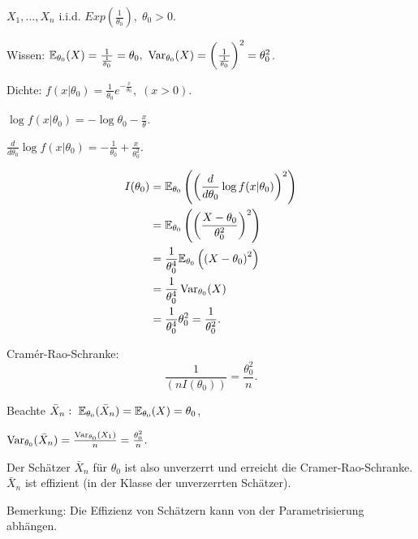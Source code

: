 \documentclass{tstextbook}
\begin{document}
\begin{example}
	$ X_1,\ldots,X_n $ i.i.d. $ Exp\left(\frac{1}{\theta_0}\right), \; \theta_0 > 0 $. 
	
	
	Wissen: $ \mathbb E_{\theta_0}(X) = \frac{1}{\frac{1}{\theta_0}} = \theta_0 , \ \operatorname{Var}_{\theta_0} (X)  = \left(\frac{1}{\frac{1}{\theta_0}}\right)^2 = \theta_0^2 $.
	
	Dichte: $ f(x|\theta_0) = \frac{1}{\theta_0} e^{-\frac{x}{\theta_0}}, \; (x > 0) $. 
	
	$ \log f(x|\theta_0) = -\log \theta_0 -  \frac{x}{\theta} $. 
	
	$ \frac{d}{d\theta_0} \log f(x|\theta_0) = -\frac{1}{\theta_0} + \frac{x}{\theta_0^2} $. 
	
	\[
	\begin{aligned}
		I(\theta_0) & = \mathbb E_{\theta_0} \left(\left(\frac{d}{d\theta_0}\log f(x|\theta_0)\right)^2\right) \\
		& = \mathbb E_{\theta_0} \left(\left(\frac{X- \theta_0}{\theta_0^2}\right)^2\right) \\
		& = \frac{1}{\theta_0^4}\mathbb E_{\theta_0} \left(\left(X- \theta_0\right)^2\right) \\
		& =\frac{1}{\theta_0^4} \operatorname{Var}_{\theta_0}(X) \\
		& = \frac{1}{\theta_0^4}\theta_0^2  = \frac{1}{\theta_0^2}.
	\end{aligned}
	\]
	
	Cramér-Rao-Schranke: 
	\[
	\frac{1}{(nI(\theta_0))} = \frac{\theta_0^2}{n}.
	\]
	
	Beachte $ \bar{X}_n: \ \mathbb E_{\theta_0} (\bar{X}_n) =   \mathbb E_{\theta_0} (X) = \theta_0 $,
	
	$ \operatorname{Var}_{\theta_0}(\bar{X}_n) = \frac{\operatorname{Var}_{\theta_0}(X_1)}{n} = \frac{\theta_0^2}{n}. $
	
	Der Schätzer  $ \bar{X}_n$ für $\theta_0$ ist also unverzerrt und erreicht die Cramer-Rao-Schranke.
	 $ \bar{X}_n$ ist effizient (in der Klasse der unverzerrten Schätzer). 
\end{example}

\begin{remark}
	Bemerkung: Die Effizienz von Schätzern kann von der Parametrisierung abhängen.
\end{remark}
\end{document}
